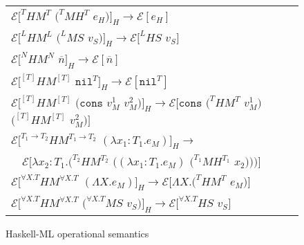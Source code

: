 \begin{figure}[p]
\centering
\begin{tabular}{l}
\vspace{5pt}

$\mathscr{E}[^{T}HM^{T}$ $(^{T}MH^{T}$ $e_{H})]_{H}\rightarrow\mathscr{E}[e_{H}]$ \\

\vspace{5pt}

$\mathscr{E}[^{L}HM^{L}$ $(^{L}MS$ $v_{S})]_{H}\rightarrow\mathscr{E}[^{L}HS$ $v_{S}]$ \\

\vspace{5pt}

$\mathscr{E}[^{N}HM^{N}$ $\overline{n}]_{H}\rightarrow\mathscr{E}[\overline{n}]$ \\

\vspace{5pt}

$\mathscr{E}[^{[T]}HM^{[T]}$ $\mathtt{nil}^{T}]_{H}\rightarrow\mathscr{E}[\mathtt{nil}^{T}]$ \\

\vspace{5pt}

$\mathscr{E}[^{[T]}HM^{[T]}$ $(\mathtt{cons}$ $v_{M}^{1}$ $v_{M}^{2})]_{H}\rightarrow\mathscr{E}[\mathtt{cons}$ $(^{T}HM^{T}$ $v_{M}^{1})$ $(^{[T]}HM^{[T]}$ $v_{M}^{2})]$ \\

\vspace{5pt}

$\mathscr{E}[^{T_{1}\rightarrow T_{2}}HM^{T_{1}\rightarrow T_{2}}$ $(\lambda x_{1}:T_{1}.e_{M})]_{H}\rightarrow$ \\

\vspace{5pt}

$\quad\mathscr{E}[\lambda x_{2}:T_{1}.(^{T_{2}}HM^{T_{2}}$ $((\lambda x_{1}:T_{1}.e_{M})$ $(^{T_{1}}MH^{T_{1}}$ $x_{2})))]$ \\

\vspace{5pt}

$\mathscr{E}[^{\forall X.T}HM^{\forall X.T}$ $(\Lambda X.e_{M})]_{H}\rightarrow\mathscr{E}[\Lambda X.(^{T}HM^{T}$ $e_{M})]$ \\

\vspace{5pt}

$\mathscr{E}[^{\forall X.T}HM^{\forall X.T}$ $(^{\forall X.T}MS$ $v_{S})]_{H}\rightarrow\mathscr{E}[^{\forall X.T}HS$ $v_{S}]$ \\
\end{tabular}
\caption{Haskell-ML operational semantics}
\label{hmos}
\end{figure}